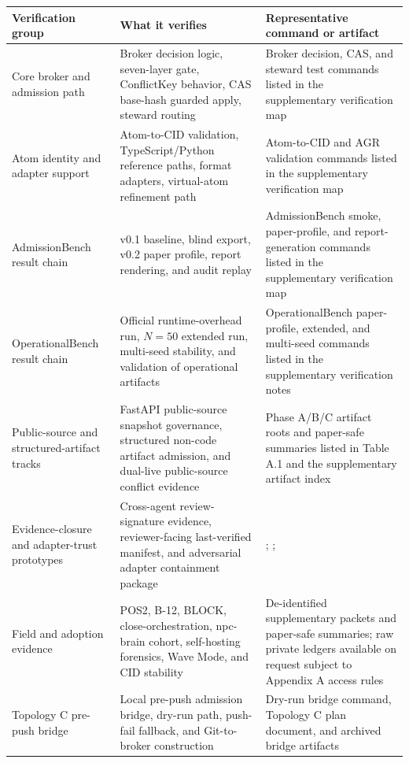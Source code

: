 \documentclass[9pt,letterpaper]{extarticle}
\newcommand{\TableLead}[1]{\par\smallskip\noindent{\raggedright\small\bfseries #1\par}\smallskip}
\begin{document}
\begin{table}[H]
\TableLead{Table A.2 --- Compact Verification Map.}
\centering
\scriptsize
\setlength{\tabcolsep}{3pt}
\begin{tabular}{@{}L{0.22\textwidth}L{0.25\textwidth}L{0.47\textwidth}@{}}
\toprule
Verification group & What it verifies & Representative command or artifact \\
\midrule
Core broker and admission path & Broker decision logic, seven-layer gate, ConflictKey behavior, CAS base-hash guarded apply, steward routing & Broker decision, CAS, and steward test commands listed in the supplementary verification map \\
Atom identity and adapter support & Atom-to-CID validation, TypeScript/Python reference paths, format adapters, virtual-atom refinement path & Atom-to-CID and AGR validation commands listed in the supplementary verification map \\
AdmissionBench result chain & v0.1 baseline, blind export, v0.2 paper profile, report rendering, and audit replay & AdmissionBench smoke, paper-profile, and report-generation commands listed in the supplementary verification map \\
OperationalBench result chain & Official runtime-overhead run, $N = 50$ extended run, multi-seed stability, and validation of operational artifacts & OperationalBench paper-profile, extended, and multi-seed commands listed in the supplementary verification notes \\
Public-source and structured-artifact tracks & FastAPI public-source snapshot governance, structured non-code artifact admission, and dual-live public-source conflict evidence & Phase A/B/C artifact roots and paper-safe summaries listed in Table A.1 and the supplementary artifact index \\
Evidence-closure and adapter-trust prototypes & Cross-agent review-signature evidence, reviewer-facing last-verified manifest, and adversarial adapter containment package & \texttt{}; \texttt{}; \texttt{} \\
Field and adoption evidence & POS2, B-12, BLOCK, close-orchestration, npc-brain cohort, self-hosting forensics, Wave Mode, and CID stability & De-identified supplementary packets and paper-safe summaries; raw private ledgers available on request subject to Appendix A access rules \\
Topology C pre-push bridge & Local pre-push admission bridge, dry-run path, push-fail fallback, and Git-to-broker \texttt{} construction & Dry-run bridge command, Topology C plan document, and archived bridge artifacts \\
\bottomrule
\end{tabular}
\end{table}
\end{document}
